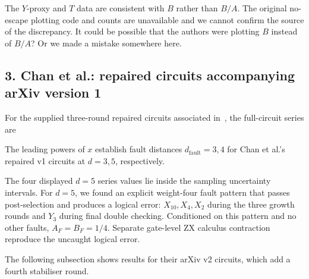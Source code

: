 The $Y$-proxy and $T$ data are consistent with $B$ rather than $B/A$. The original no-escape plotting code and counts are unavailable and we cannot confirm the source of the discrepancy. 
It could be possible that the authors were plotting $B$ instead of $B/A$? Or we made a mistake somewhere here.

\subsection*{3. Chan et al.: repaired circuits accompanying arXiv version 1}

For the supplied three-round repaired circuits associated in~\cite{chan2026diagnosingrestoringdegradedfault}, the full-circuit series are
{\small

}

The leading powers of $x$ establish fault distances $d_{\text{fault}}=3,4$
for Chan et al.'s repaired v1 circuits at $d=3,5$, respectively.


The four displayed $d=5$ series values lie inside the sampling
uncertainty intervals. For $d=5$, we found an explicit weight-four fault pattern that
passes post-selection and produces a logical error: $X_{10},X_4,X_2$
during the three growth rounds and $Y_3$ during final double checking.
Conditioned on this pattern and no other faults, $A_F=B_F=1/4$.
Separate gate-level ZX calculus contraction reproduce the uncaught logical error.

The following subsection shows results for their arXiv v2 circuits, which add a
fourth stabiliser round.


